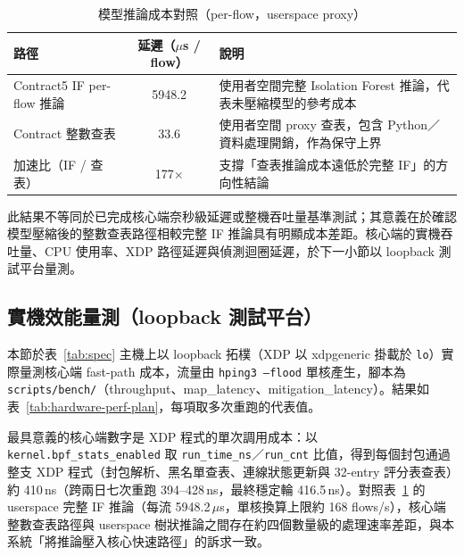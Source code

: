 \documentclass[12pt, a4paper, fontset=none]{ctexart}
\newcommand{\code}[1]{\texttt{#1}}
\begin{document}
\begin{table}[H]
  \centering
  \caption{模型推論成本對照（per-flow，userspace proxy）}
  \label{tab:inference-cost}
  \renewcommand{\arraystretch}{1.2}
  \begin{tabularx}{\textwidth}{l c X}
    \toprule
    \textbf{路徑} & \textbf{延遲（$\mu$s / flow）} & \textbf{說明} \\
    \midrule
    Contract5 IF per-flow 推論 & 5948.2 & 使用者空間完整 Isolation Forest 推論，代表未壓縮模型的參考成本 \\
    Contract 整數查表 & 33.6 & 使用者空間 proxy 查表，包含 Python／資料處理開銷，作為保守上界 \\
    加速比（IF / 查表） & 177$\times$ & 支撐「查表推論成本遠低於完整 IF」的方向性結論 \\
    \bottomrule
  \end{tabularx}
\end{table}

此結果不等同於已完成核心端奈秒級延遲或整機吞吐量基準測試；其意義在於確認模型壓縮後的整數查表路徑相較完整 IF 推論具有明顯成本差距。核心端的實機吞吐量、CPU 使用率、XDP 路徑延遲與偵測迴圈延遲，於下一小節以 loopback 測試平台量測。

\subsection{實機效能量測（loopback 測試平台）}
本節於表~\ref{tab:spec} 主機上以 loopback 拓樸（XDP 以 xdpgeneric 掛載於 \code{lo}）實際量測核心端 fast-path 成本，流量由 \code{hping3 --flood} 單核產生，腳本為 \code{scripts/bench/}（throughput、map\_latency、mitigation\_latency）。結果如表~\ref{tab:hardware-perf-plan}，每項取多次重跑的代表值。

最具意義的核心端數字是 XDP 程式的單次調用成本：以 \code{kernel.bpf\_stats\_enabled} 取 \code{run\_time\_ns}／\code{run\_cnt} 比值，得到每個封包通過整支 XDP 程式（封包解析、黑名單查表、連線狀態更新與 32-entry 評分表查表）約 410\,ns（跨兩日七次重跑 394--428\,ns，最終穩定輪 416.5\,ns）。對照表~\ref{tab:inference-cost} 的 userspace 完整 IF 推論（每流 5948.2\,$\mu$s，單核換算上限約 168 flows/s），核心端整數查表路徑與 userspace 樹狀推論之間存在約四個數量級的處理速率差距，與本系統「將推論壓入核心快速路徑」的訴求一致。
\end{document}
